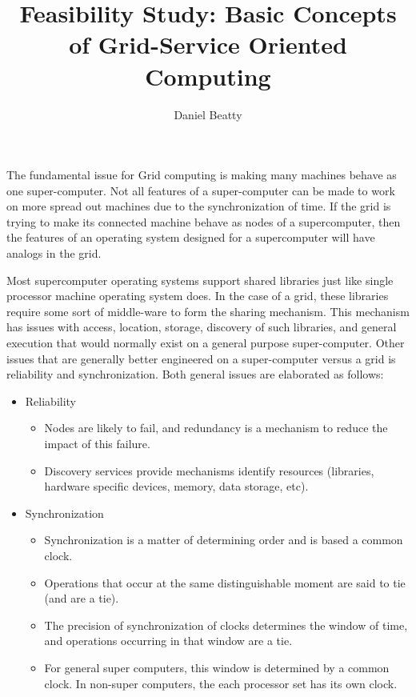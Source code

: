 \documentclass[11pt]{article}
\title{Feasibility Study: Basic Concepts of Grid-Service Oriented Computing}
\author{Daniel Beatty}
\begin{document}
\maketitle

The fundamental issue for Grid computing is making many machines behave as one super-computer.  Not all features of a super-computer can be made to work on more spread out machines due to the synchronization of time.   If the grid is trying to make its connected machine behave as nodes of a supercomputer, then the features of an operating system designed for a supercomputer will have analogs in the grid.  

Most supercomputer operating systems support shared libraries just like single processor machine operating system does.  In the case of a grid, %
these libraries require some sort of middle-ware to form the sharing mechanism.  This mechanism has issues with access, location, storage, discovery of such libraries,  and general execution that would normally exist on a general purpose super-computer.   Other issues that are generally better engineered on a super-computer versus a grid is reliability and synchronization.  
Both general issues are elaborated as follows:  
\begin{itemize}
\item Reliability
\begin{itemize}
\item Nodes are likely to fail, and redundancy is a mechanism to reduce the impact of this failure.  
\item Discovery services provide mechanisms identify resources (libraries, hardware specific devices, memory, data storage, etc).  
\end{itemize}
\item Synchronization 
\begin{itemize}
\item Synchronization is a matter of determining order and is based a common clock.  
\item Operations that occur at the same distinguishable moment are said to tie (and are a tie).  
\item The precision of synchronization of clocks determines the window of time, and operations occurring in that window are a tie.  
\item For general super computers, this window is determined by a common clock.  In non-super computers, the each processor set has its own clock.  
\end{itemize}
\end{itemize}
\end{document}

